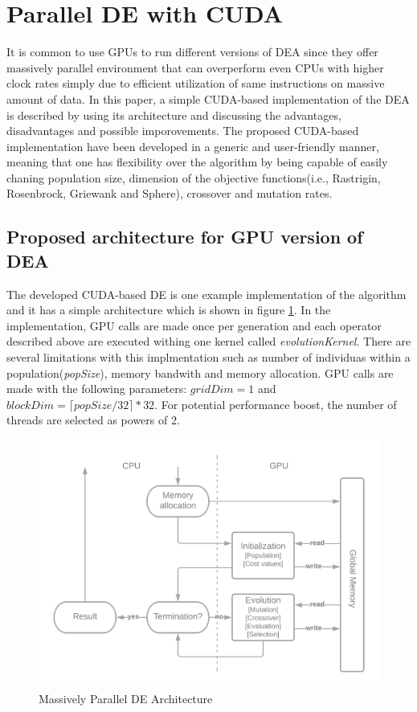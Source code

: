 \documentclass[conference]{IEEEtran}
\begin{document}
\section{Parallel DE with CUDA}
It is common to use GPUs to run different versions of DEA since they offer massively parallel environment that can overperform even CPUs with higher clock rates simply due to efficient utilization of 
same instructions on massive amount of data. In this paper, a simple CUDA-based implementation of the DEA is described by using its architecture and discussing the advantages, disadvantages and 
possible imporovements. The proposed CUDA-based implementation have been developed in a generic and user-friendly manner, meaning that one has flexibility over the algorithm by being capable of 
easily chaning population size, dimension of the objective functions(i.e., Rastrigin, Rosenbrock, Griewank and Sphere), crossover and mutation rates.

\subsection{Proposed architecture for GPU version of DEA}
The developed CUDA-based DE is one example implementation of the algorithm and it has a simple architecture which is shown in figure \ref{fig:mp_arch}. In the implementation, GPU calls 
are made once per generation and each operator described above are executed withing one kernel called \textit{evolutionKernel}. There are several limitations with this implmentation such as number 
of individuas within a population(\textit{popSize}), memory bandwith and memory allocation. GPU calls are made with the following parameters: $\textit{gridDim}=1$ and 
$\textit{blockDim}=\lceil \textit{popSize} / 32 \rceil * 32$. For potential performance boost, the number of threads are selected as powers of 2.

\begin{figure}[h]
	\centering
	\includegraphics[width=0.75\linewidth]{img/arch.png}
	\caption{Massively Parallel DE Architecture}
	\label{fig:mp_arch}
\end{figure}
\end{document}
